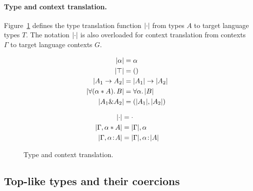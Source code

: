 \paragraph{Type and context translation.}
Figure~\ref{fig:type-and-context-translation} defines the type translation
function $\lvert \cdot \rvert$ from \name types $A$ to target language types $T$. 
The notation $\lvert \cdot \rvert$ is also overloaded for context translation from \name
contexts $\Gamma$ to target language contexts $G$.

\begin{figure}[!t]

  \begin{align*}
    \lvert \alpha \rvert                &= \alpha \\
    \lvert \top \rvert                  &= () \\
    \lvert A_1 \to A_2 \rvert         &= \lvert A_1 \rvert \to \lvert A_2 \rvert \\
    \lvert \forall (\alpha * A).\, B \rvert  &= \forall \alpha.\, \lvert B \rvert \\
    \lvert A_1 \& A_2 \rvert      &= (\lvert A_1 \rvert, \lvert A_2 \rvert) \\
  \end{align*}


  \begin{align*}
    \lvert \cdot \rvert                        &= \cdot \\
    \lvert \Gamma, \alpha * A \rvert &= \lvert \Gamma \rvert, \alpha \\
    \lvert \Gamma, \alpha \!:\! A \rvert   &= \lvert \Gamma \rvert, \alpha \!:\! \lvert A \rvert
  \end{align*}

  \caption{Type and context translation.}
  \label{fig:type-and-context-translation}
\end{figure}


\subsection{Top-like types and their coercions}

